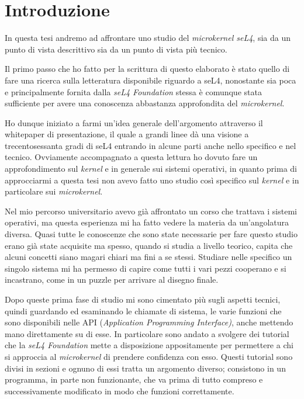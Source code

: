 \chapter{Introduzione}
In questa tesi andremo ad affrontare uno studio del \textit{microkernel seL4}, sia da un punto di vista descrittivo sia da un punto di vista più tecnico.

Il primo passo che ho fatto per la scrittura di questo elaborato è stato quello di fare una ricerca sulla letteratura disponibile riguardo a seL4, nonostante sia poca e principalmente fornita dalla \textit{seL4 Foundation} stessa è comunque stata sufficiente per avere una conoscenza abbastanza approfondita del \textit{microkernel}.

Ho dunque iniziato a farmi un'idea generale dell'argomento attraverso il whitepaper \cite{sel4-whitepaper} di presentazione, il quale a grandi linee dà una visione a trecentosessanta gradi di seL4 entrando in alcune parti anche nello specifico e nel tecnico. Ovviamente accompagnato a questa lettura ho dovuto fare un approfondimento sul \textit{kernel} e in generale sui sistemi operativi, in quanto prima di approcciarmi a questa tesi non avevo fatto uno studio così specifico sul \textit{kernel} e in particolare sui \textit{microkernel}.

Nel mio percorso universitario avevo già affrontato un corso che trattava i sistemi operativi, ma questa esperienza mi ha fatto vedere la materia da un'angolatura diversa. Quasi tutte le conoscenze che sono state necessarie per fare questo studio erano già state acquisite ma spesso, quando si studia a livello teorico, capita che alcuni concetti siano magari chiari ma fini a se stessi. Studiare nelle specifico un singolo sistema mi ha permesso di capire come tutti i vari pezzi cooperano e si incastrano, come in un puzzle per arrivare al disegno finale.

Dopo queste prima fase di studio mi sono cimentato più sugli aspetti tecnici, quindi guardando ed esaminando le chiamate di sistema, le varie funzioni che sono disponibili nelle API (\textit{Application Programming Interface)}, anche mettendo mano direttamente su di esse. In particolare sono andato a svolgere dei tutorial che la \textit{seL4 Foundation} mette a disposizione appositamente per permettere a chi si approccia al \textit{microkernel} di prendere confidenza con esso. Questi tutorial sono divisi in sezioni e ognuno di essi tratta un argomento diverso; consistono in un programma, in parte non funzionante, che va prima di tutto compreso e successivamente modificato in modo che funzioni correttamente.

